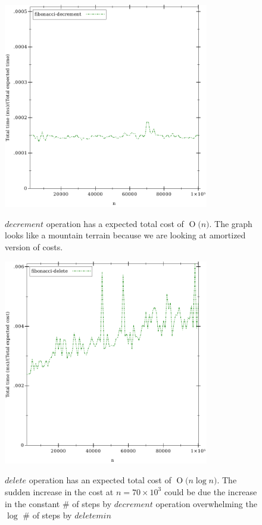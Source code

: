 \documentclass{llncs}
\newcommand{\BigO}[1]{\ensuremath{\operatorname{O}\bigl(#1\bigr)}}
\begin{document}
\begin{figure}
	\begin{center}
		\includegraphics[width=0.8\textwidth]{FIG/decrement.pdf}
		\caption{$decrement$ operation has a expected total cost of \BigO{n}. The graph looks like a mountain terrain because we are looking at amortized version of costs.}
		\label{fig:fi_decrement}
		\includegraphics[width=0.8\textwidth]{FIG/delete.pdf}
		\caption{$delete$ operation has an expected total cost of \BigO{n \log n}. The sudden increase in the cost at $n=70\times10^3$ could be due the increase in the constant \# of steps by $decrement$ operation overwhelming the $\log$ \# of steps by $deletemin$ }
		\label{fig:fi_delete}
	\end{center}
\end{figure}
\end{document}
